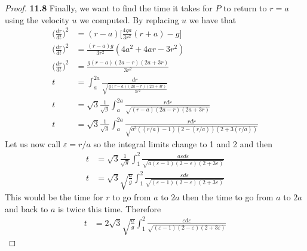 \documentclass[11pt]{article}
\theoremstyle{definition}
\begin{document}
\begin{proof}{\textbf{11.8}}
    Finally, we want to find the time it takes for $P$ to return to $r = a$
    using the velocity $u$ we computed. By replacing $u$ we have that
    \begin{align*}
        \bigg(\frac{dr}{dt}\bigg)^2 &= (r - a)\bigg[\frac{4ga}{3r^2}(r + a) - g\bigg]\\
        \bigg(\frac{dr}{dt}\bigg)^2 &= \frac{(r - a)g}{3r^2}(4a^2 + 4ar - 3r^2)\\
        \bigg(\frac{dr}{dt}\bigg)^2 &= \frac{g(r - a)(2a-r)(2a+3r)}{3r^2}\\
        t &= \int_{a}^{2a} \frac{dr}{\sqrt{\frac{g(r - a)(2a-r)(2a+3r)}{3r^2}}}\\
        t &= \sqrt{3}\frac{1}{\sqrt{g}}\int_{a}^{2a} \frac{rdr}{\sqrt{(r - a)(2a-r)(2a+3r)}}\\
        t &= \sqrt{3}\frac{1}{\sqrt{g}}\int_{a}^{2a}
        \frac{rdr}{\sqrt{a^3((r/a) - 1)(2-(r/a))(2+3(r/a))}}
    \end{align*}
    Let us now call $\varepsilon = r/a$ so the integral limits change to 1
    and 2 and then
    \begin{align*}
        t &= \sqrt{3}\frac{1}{\sqrt{g}}\int_{1}^{2}
        \frac{a\varepsilon d\varepsilon}
        {\sqrt{a(\varepsilon - 1)(2-\varepsilon)(2+3\varepsilon)}}\\
        t &= \sqrt{3}\sqrt{\frac{a}{g}}\int_{1}^{2}
        \frac{\varepsilon d\varepsilon}
        {\sqrt{(\varepsilon - 1)(2-\varepsilon)(2+3\varepsilon)}}
    \end{align*}
    This would be the time for $r$ to go from $a$ to $2a$ then the time to go
    from $a$ to $2a$ and back to $a$ is twice this time. Therefore
    \begin{align*}
        t &= 2\sqrt{3}\sqrt{\frac{a}{g}}\int_{1}^{2}
        \frac{\varepsilon d\varepsilon}
        {\sqrt{(\varepsilon - 1)(2-\varepsilon)(2+3\varepsilon)}}
    \end{align*}
\end{proof}
\cleardoublepage
\end{document}

